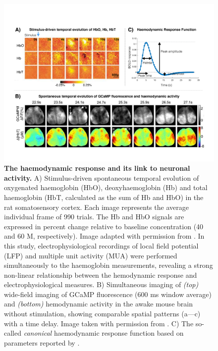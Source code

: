 \begin{figure}[h!]
\centering\includegraphics[width=1\linewidth]{images/Ch2/Ch2_HRF.pdf}
\caption{\textbf{The haemodynamic response and its link to neuronal activity.} A) Stimulus-driven spontaneous temporal evolution of oxygenated haemoglobin (HbO), deoxyhaemoglobin (Hb) and total haemoglobin (HbT, calculated as the sum of Hb and HbO) in the rat somatosensory cortex. Each image represents the average individual frame of 990 trials.  The Hb and HbO signals are expressed in percent change relative to baseline concentration (40 and 60 M, respectively). Image adapted with permission from \citet{Devor2003}. In this study, electrophysiological recordings of  local field potential (LFP) and multiple unit activity (MUA) were performed simultaneously to the haemoglobin measurements, revealing a strong non-linear relationship between the hemodynamic response and electrophysiological measures. B) Simultaneous imaging of \textit{(top)} wide-field imaging of GCaMP fluorescence (600 ms window average) and \textit{(bottom)} hemodynamic activity in the awake mouse brain without stimulation, showing comparable spatial patterns (a---c) with a time delay. Image taken with permission from \citet{Ma2016}. C) The so-called \textit{canonical} haemodynamic response function based on parameters reported by \citet{Friston1998}.  } \label{fig:HRF}
\end{figure}




